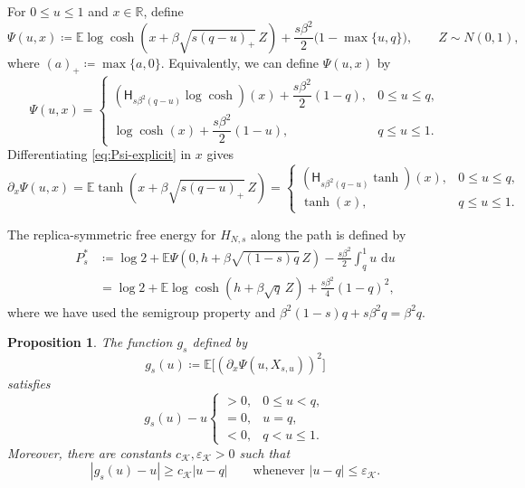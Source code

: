 \documentclass[11pt]{article}
\newtheorem{proposition}[theorem]{Proposition}
\numberwithin{equation}{section}
\newcommand{\E}{\mathbb{E}}
\newcommand{\1}{\mathbf 1}
\newcommand{\cK}{\mathcal K}
\newcommand{\dd}{\,\mathrm d}
\begin{document}
For $0\le u\le1$ and $x\in\mathbb R$, define
\begin{equation}
 \Psi(u,x)
 \coloneqq
 \E\log\cosh\left(
 x+\beta\sqrt{s(q-u)_+}\,Z
 \right)
 +\frac{s\beta^2}{2}\bigl(1-\max\{u,q\}\bigr),
 \qquad Z\sim N(0,1),
 \label{eq:Psi-explicit}
\end{equation}
where $(a)_+\coloneqq\max\{a,0\}$.  Equivalently, we can define $\Psi (u,x)$ by
\[
 \Psi(u,x)
 =
 \begin{cases}
  (\mathsf H_{s\beta^2(q-u)}\log\cosh)(x)
  +\dfrac{s\beta^2}{2}(1-q),
  &0\le u\le q,\\[2mm]
  \log\cosh(x)+\dfrac{s\beta^2}{2}(1-u),
  &q\le u\le1.
 \end{cases}
\]
Differentiating \eqref{eq:Psi-explicit} in $x$ gives
\begin{equation}
 \partial_x\Psi(u,x)
 =
 \E\tanh\left(
 x+\beta\sqrt{s(q-u)_+}\,Z
 \right)
 =
 \begin{cases}
  (\mathsf H_{s\beta^2(q-u)}\tanh)(x),
      &0\le u\le q,\\
  \tanh(x),&q\le u\le1.
 \end{cases}
 \label{eq:Psi-x}
\end{equation}

The replica-symmetric free energy for $H_{N,s}$ along the path is defined by
\begin{align}
 P_s^*& \coloneqq\log2+
 \E\Psi(0,h+\beta\sqrt{(1-s)q}\,Z)
 -\frac{s\beta^2}{2}\int_q^1u\,\dd u
 \label{eq:scalartrial}\\
 &= \log2+\E\log\cosh(h+\beta\sqrt q\,Z)
 +\frac{s\beta^2}{4}(1-q)^2,
 \label{eq:RSpathvalue}
\end{align}
where we have used the semigroup property and
$\beta^2(1-s)q+s\beta^2q=\beta^2q$.


\begin{proposition}
\label{prop:pathRS}
The function $g_s$ defined by
\begin{equation}
 g_s(u)\coloneqq\E\bigl[(\partial_x\Psi(u,X_{s,u}))^2\bigr]
 \label{eq:gs-def}
\end{equation}
satisfies
\begin{equation}
 g_s(u)-u
 \begin{cases}
 >0,&0\le u<q,\\
 =0,&u=q,\\
 <0,&q<u\le1.
 \end{cases}
 \label{eq:ATsign}
\end{equation}
Moreover, there are constants $c_{\cK},\varepsilon_{\cK}>0$ such that
\begin{equation}
 |g_s(u)-u|\ge c_{\cK}|u-q|
 \qquad\text{whenever }|u-q|\le\varepsilon_{\cK}.
 \label{eq:linearATsign}
\end{equation}
\end{proposition}
\end{document}
